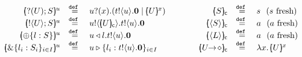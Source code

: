 \begin{figure}
	\begin{comment}
\[
	\begin{array}{rclcrcl}
		\mapchar{\btinp{U} S}{u}
		&\defeq&
		\binp{u}{x} (\binp{t}{y} (\appl{y}{u}) \Par \mapchar{U}{x})
		&\qquad &
		\omapchar{S}  & \defeq &  s ~~ (s \textrm{ fresh})
		\\
		\mapchar{\btout{U} S}{u}
		&\defeq&
		\bout{u}{\omapchar{U}} \binp{t}{y} (\appl{y}{x})
		&&
		\omapchar{\chtype{S}} \defeq \omapchar{\chtype{L}} &\defeq&a ~~ (a \textrm{ fresh})
		\\
		\mapchar{\btsel{l : S}}{u}
		& \defeq &
		\bsel{u}{l} \binp{t}{y} (\appl{y}{x})
		&&
		\omapchar{\shot{U}} \defeq \omapchar{\lhot{U}} & \defeq &  \abs{x}{\mapchar{U}{x}}
		\\
		\mapchar{\btbra{l_i: S_i}_{i \in I}}{u}
		& \defeq &
		\bbra{u}{l_i: \binp{t}{y} (\appl{y}{x})}_{i \in I}
		&&
		 
		&   &
		 
%		 
		\\
\dk{		\mapchar{\trec{t}{S}}{u}}
		&\defeq&
		\mapchar{S \subst{\trec{t}{S}}{\vart{t}}}{u}
		&&
		 
		& &
		 
		\\
		\mapchar{\tinact}{u}
		& \defeq &
		\inact
		& & 
		  
		& &
		 
		\\
		\mapchar{\chtype{S}}{u} 
		&\defeq&
		\bout{u}{\omapchar{S}} \binp{t}{y} (\appl{y}{x})
		& & 	
					 
		&   &
		 
		\\
		\mapchar{\chtype{L}}{u}
		&\defeq&
		 \bout{u}{\omapchar{L}} \binp{t}{y} (\appl{y}{x})
		&&
		 
		& &
 
		\\
		\mapchar{\shot{U}}{u}
		\defeq 
		\mapchar{\lhot{U}}{u}
		&\defeq &
		\appl{u}{\omapchar{U}}
		&&
		 
		& &
		 	\end{array}
	\]
\end{comment}
\[
	\begin{array}{rclcrcl}
		\mapchar{\btinp{U} S}{u}
		&\defeq&
		\binp{u}{x} (\bout{t}{u} \inact \Par \mapchar{U}{x})
		&\qquad &
		\omapchar{S}  & \defeq &  s ~~ (s \textrm{ fresh})
		\\
		\mapchar{\btout{U} S}{u}
		&\defeq&
		\bout{u}{\omapchar{U}} \bout{t}{u} \inact
		&&
		\omapchar{\chtype{S}} &\defeq& a ~~ (a \textrm{ fresh})
		\\
		\mapchar{\btsel{l : S}}{u}
		& \defeq &
		\bsel{u}{l} \bout{t}{u} \inact
		&&
		\omapchar{\chtype{L}} &\defeq&a ~~ (a \textrm{ fresh})
		\\
		\mapchar{\btbra{l_i: S_i}_{i \in I}}{u}
		& \defeq &
		\bbra{u}{l_i: \bout{t}{u} \inact}_{i \in I}		 
		&&
		\omapchar{\shot{U}} &\defeq& \abs{x}{\mapchar{U}{x}}
		\\
		 

\end{array}\]
\end{figure}
